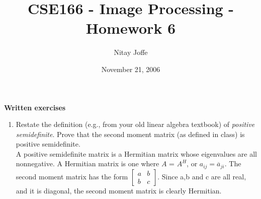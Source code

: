 \documentclass{article}
\title{CSE166 - Image Processing - Homework 6}
\author{Nitay Joffe}
\date{November 21, 2006}
\begin{document}
\maketitle

\noindent
{\bf Written exercises}
\begin{enumerate}
  \item Restate the definition (e.g., from your old linear algebra
  textbook) of {\em positive semidefinite}.  Prove that the second
  moment matrix (as defined in class) is positive semidefinite.\\
  \linebreak\linebreak
  A positive semidefinite matrix is a Hermitian matrix whose eigenvalues are
  all nonnegative. A Hermitian matrix is one where $A$ = $A^H$, or
  $a_{ij} = \overline{a}_{ji}$. The second moment matrix has the form
  $\left[\begin{array}{cc}
           a & b\\
           b & c
         \end{array}\right]$. Since a,b and c are all
  real, and it is diagonal, the second moment matrix is clearly Hermitian.\\


\end{enumerate}
\end{document}
